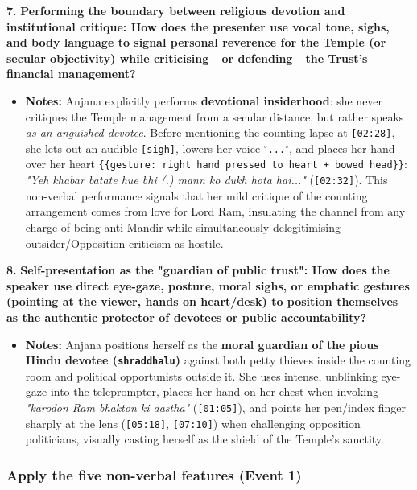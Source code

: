 \documentclass[10pt,a4paper]{article}
\begin{document}
\noindent\textbf{7.} \textbf{Performing the boundary between religious devotion and institutional critique: How does the presenter use vocal tone, sighs, and body language to signal personal reverence for the Temple (or secular objectivity) while criticising---or defending---the Trust's financial management?}\par\smallskip
\begin{itemize}
  \item \textbf{Notes:}
Anjana explicitly performs \textbf{devotional insiderhood}: she never critiques the Temple management from a secular distance, but rather speaks \textit{as an anguished devotee}. Before mentioning the counting lapse at \texttt{[02:28]}, she lets out an audible \texttt{[sigh]}, lowers her voice \texttt{$^\circ$...$^\circ$}, and places her hand over her heart \texttt{\{\{gesture: right hand pressed to heart + bowed head\}\}}: \textit{"Yeh khabar batate hue bhi (.) mann ko dukh hota hai..."} (\texttt{[02:32]}). This non-verbal performance signals that her mild critique of the counting arrangement comes from love for Lord Ram, insulating the channel from any charge of being anti-Mandir while simultaneously delegitimising outsider/Opposition criticism as hostile.\par\smallskip
\end{itemize}

\noindent\textbf{8.} \textbf{Self-presentation as the "guardian of public trust": How does the speaker use direct eye-gaze, posture, moral sighs, or emphatic gestures (pointing at the viewer, hands on heart/desk) to position themselves as the authentic protector of devotees or public accountability?}\par\smallskip
\begin{itemize}
  \item \textbf{Notes:}
Anjana positions herself as the \textbf{moral guardian of the pious Hindu devotee (\texttt{shraddhalu})} against both petty thieves inside the counting room and political opportunists outside it. She uses intense, unblinking eye-gaze into the teleprompter, places her hand on her chest when invoking \textit{"karodon Ram bhakton ki aastha"} (\texttt{[01:05]}), and points her pen/index finger sharply at the lens (\texttt{[05:18]}, \texttt{[07:10]}) when challenging opposition politicians, visually casting herself as the shield of the Temple's sanctity.\par\smallskip
\end{itemize}

\subsubsection*{Apply the five non-verbal features (Event 1)}
\end{document}
